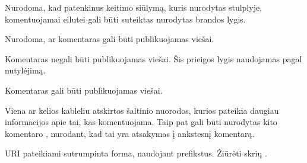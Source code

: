 \documentclass[letterpaper,10pt,lithuanian]{sphinxmanual}
\begin{document}

\begin{fulllineitems}
\label{\detokenize{dimensijos:comment.level}}
\pysigstartsignatures
{}
\pysigstopsignatures
\sphinxAtStartPar
Nurodoma, kad patenkinus keitimo siūlymą, kuris nurodytas
{\hyperref[\detokenize{dimensijos:comment.prepare}]{}} stulplyje, komentuojamai eilutei gali būti
suteiktas nurodytas brandos lygis.

\end{fulllineitems}


\begin{fulllineitems}
\label{\detokenize{dimensijos:comment.access}}
\pysigstartsignatures
{}
\pysigstopsignatures
\sphinxAtStartPar
Nurodoma, ar komentaras gali būti publikuojamas viešai.
\begin{description}
\sphinxAtStartPar
Komentaras negali būti publikuojamas viešai. Šis prieigos lygis
naudojamas pagal nutylėjimą.

\sphinxAtStartPar
Komentaras gali būti publikuojamas viešai.

\end{description}

\end{fulllineitems}


\begin{fulllineitems}
\label{\detokenize{dimensijos:comment.uri}}
\pysigstartsignatures
{}
\pysigstopsignatures
\sphinxAtStartPar
Viena ar kelios kableliu atskirtos šaltinio nuorodos, kurios pateikia
daugiau informacijos apie tai, kas komentuojama. Taip pat gali būti
nurodytas kito komentaro {\hyperref[\detokenize{dimensijos:comment.id}]{}}, nurodant, kad tai yra
atsakymas į ankstesnį komentarą.

\sphinxAtStartPar
URI pateikiami sutrumpinta forma, naudojant prefikstus. Žiūrėti skrių
{\hyperref[\detokenize{zodynai:vocab}]{}}.

\end{fulllineitems}
\end{document}
